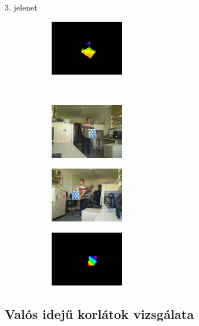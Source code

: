 \begin{frame}{3. jelenet}
\begin{figure}
\begin{subfigure}[b]{.32\linewidth}
  \end{subfigure}
\begin{subfigure}[b]{.32\linewidth}
	\centering
	\includegraphics[width=90pt]{figures/scene3/vis_196.png}
  \end{subfigure}\\\vspace{3pt}
 \begin{subfigure}[b]{.32\linewidth}
	\centering
	\includegraphics[width=90pt]{figures/scene3/left_376.png}
  \end{subfigure}
\begin{subfigure}[b]{.32\linewidth}
	\centering
	\includegraphics[width=90pt]{figures/scene3/right_376.png}
  \end{subfigure}
\begin{subfigure}[b]{.32\linewidth}
	\centering
	\includegraphics[width=90pt]{figures/scene3/vis_376.png}
  \end{subfigure}
\end{figure}

\end{frame}


\subsection{Valós idejű korlátok vizsgálata}

